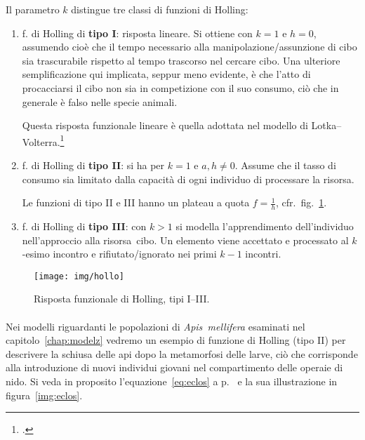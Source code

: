 Il parametro $k$ distingue tre classi di funzioni di Holling:
\begin{enumerate}
    \item f. di Holling di \textbf{tipo I}: risposta lineare. Si ottiene con $k=1$ e $h=0$, assumendo cioè che il tempo
        necessario alla manipolazione/assunzione di cibo sia trascurabile rispetto al tempo trascorso nel cercare cibo.
        Una ulteriore semplificazione qui implicata, seppur meno evidente, è che l'atto di procacciarsi il cibo non sia
        in competizione con il suo consumo, ciò che in generale è falso nelle specie animali.

        Questa risposta funzionale lineare è quella adottata nel modello di Lotka--Volterra.\footcite{vito}
    \item f. di Holling di \textbf{tipo II}: si ha per $k=1$ e $a,h \neq 0$. Assume che il tasso di consumo sia limitato
        dalla capacità di ogni individuo di processare la risorsa.

        Le funzioni di tipo II e III hanno un plateau a quota $f=\frac{1}{h}$, cfr.~fig.~\ref{img:hollo}.

    \item f. di Holling di \textbf{tipo III}: con $k>1$ si modella l'apprendimento dell'individuo nell'approccio alla
        risorsa~cibo. Un elemento viene accettato e processato al $k$-esimo incontro e rifiutato/ignorato nei
        primi $k-1$ incontri.
\end{enumerate}

\begin{figure}[hbt]
    \centering
    \texttt{[image: img/hollo]}

    \caption{Risposta funzionale di Holling, tipi I--III.}
    \label{img:hollo}
\end{figure}

\paragraph{}
Nei modelli riguardanti le popolazioni di \emph{Apis~mellifera} esaminati nel capitolo~\ref{chap:modelz} vedremo
un esempio di
funzione di Holling (tipo II) per descrivere la schiusa delle api dopo la metamorfosi delle larve, ciò che corrisponde alla
introduzione di nuovi individui giovani nel compartimento delle operaie di nido.
Si veda in proposito l'equazione~\eqref{eq:eclos} a p.~\pageref{eq:eclos} e la sua illustrazione in figura~\ref{img:eclos}.

